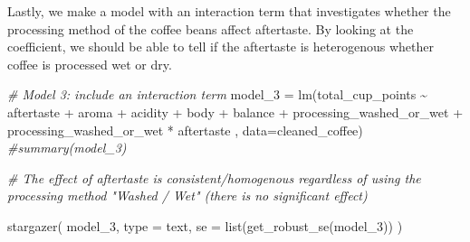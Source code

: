 \documentclass[
]{article}
\newenvironment{Shaded}{\begin{snugshade}}{\end{snugshade}}
\newcommand{\AttributeTok}[1]{\textcolor[rgb]{0.77,0.63,0.00}{#1}}
\newcommand{\CommentTok}[1]{\textcolor[rgb]{0.56,0.35,0.01}{\textit{#1}}}
\newcommand{\FunctionTok}[1]{\textcolor[rgb]{0.00,0.00,0.00}{#1}}
\newcommand{\NormalTok}[1]{#1}
\newcommand{\OtherTok}[1]{\textcolor[rgb]{0.56,0.35,0.01}{#1}}
\newcommand{\SpecialCharTok}[1]{\textcolor[rgb]{0.00,0.00,0.00}{#1}}
\newcommand{\StringTok}[1]{\textcolor[rgb]{0.31,0.60,0.02}{#1}}
\begin{document}
Lastly, we make a model with an interaction term that investigates
whether the processing method of the coffee beans affect aftertaste. By
looking at the coefficient, we should be able to tell if the aftertaste
is heterogenous whether coffee is processed wet or dry.

\begin{Shaded}
\begin{Highlighting}[]
\CommentTok{\# Model 3: include an interaction term}
\NormalTok{model\_3 }\OtherTok{=} \FunctionTok{lm}\NormalTok{(total\_cup\_points }\SpecialCharTok{\textasciitilde{}}\NormalTok{ aftertaste }\SpecialCharTok{+}\NormalTok{ aroma }\SpecialCharTok{+}\NormalTok{ acidity }\SpecialCharTok{+}\NormalTok{ body }\SpecialCharTok{+}\NormalTok{ balance }\SpecialCharTok{+}\NormalTok{ processing\_washed\_or\_wet }\SpecialCharTok{+}\NormalTok{ processing\_washed\_or\_wet }\SpecialCharTok{*}\NormalTok{ aftertaste , }\AttributeTok{data=}\NormalTok{cleaned\_coffee)}
\CommentTok{\#summary(model\_3)}

\CommentTok{\# The effect of aftertaste is consistent/homogenous regardless of using the processing method "Washed / Wet"  (there is no significant effect)}
\end{Highlighting}
\end{Shaded}

\begin{Shaded}
\begin{Highlighting}[]
 \FunctionTok{stargazer}\NormalTok{(}
\NormalTok{   model\_3, }
   \AttributeTok{type =} \StringTok{\textquotesingle{}text\textquotesingle{}}\NormalTok{, }
   \AttributeTok{se =} \FunctionTok{list}\NormalTok{(}\FunctionTok{get\_robust\_se}\NormalTok{(model\_3))}
\NormalTok{   )}
\end{Highlighting}
\end{Shaded}
\end{document}
